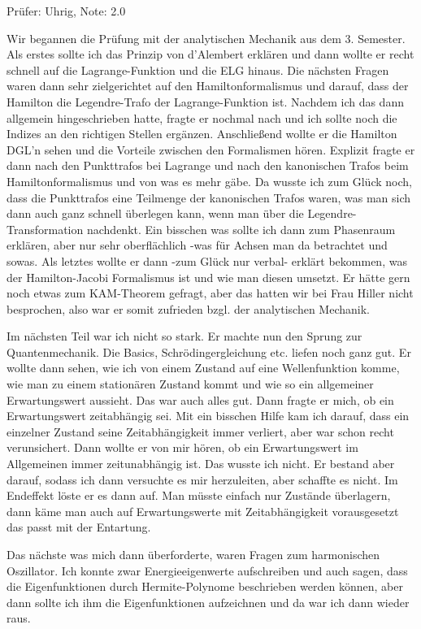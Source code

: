 Prüfer: Uhrig, Note: 2.0

\noindent Wir begannen die Prüfung mit der analytischen Mechanik aus dem 3. Semester. 
Als erstes sollte ich das Prinzip von d'Alembert erklären und dann wollte er recht schnell auf die Lagrange-Funktion und die ELG hinaus. 
Die nächsten Fragen waren dann sehr zielgerichtet auf den Hamiltonformalismus und darauf, dass der Hamilton die Legendre-Trafo der Lagrange-Funktion ist.
Nachdem ich das dann allgemein hingeschrieben hatte, fragte er nochmal nach und ich sollte noch die Indizes an den richtigen Stellen ergänzen. 
Anschließend wollte er die Hamilton DGL'n sehen und die Vorteile zwischen den Formalismen hören. Explizit fragte er dann nach den Punkttrafos bei Lagrange und nach den kanonischen Trafos beim Hamiltonformalismus und von was es mehr gäbe. Da wusste ich zum Glück noch, dass die Punkttrafos eine Teilmenge der kanonischen Trafos waren, was man sich dann auch ganz schnell überlegen kann, wenn man über die Legendre-Transformation nachdenkt. 
Ein bisschen was sollte ich dann zum Phasenraum erklären, aber nur sehr oberflächlich -was für Achsen man da betrachtet und sowas. 
Als letztes wollte er dann -zum Glück nur verbal- erklärt bekommen, was der Hamilton-Jacobi Formalismus ist und wie man diesen umsetzt. 
Er hätte gern noch etwas zum KAM-Theorem gefragt, aber das hatten wir bei Frau Hiller nicht besprochen, also war er somit zufrieden bzgl. der analytischen Mechanik.

\noindent Im nächsten Teil war ich nicht so stark. Er machte nun den Sprung zur Quantenmechanik. Die Basics, Schrödingergleichung etc. liefen noch ganz gut. Er wollte dann sehen, wie ich von einem Zustand auf eine Wellenfunktion komme, wie man zu einem stationären Zustand kommt und wie so ein allgemeiner Erwartungswert aussieht. Das war auch alles gut. 
Dann fragte er mich, ob ein Erwartungswert zeitabhängig sei. Mit ein bisschen Hilfe kam ich darauf, dass ein einzelner Zustand seine Zeitabhängigkeit immer verliert, aber war schon recht verunsichert. Dann wollte er von mir hören, ob ein Erwartungswert im Allgemeinen immer zeitunabhängig ist. Das wusste ich nicht. Er bestand aber darauf, sodass ich dann versuchte es mir herzuleiten, aber schaffte es nicht. Im Endeffekt löste er es dann auf. Man müsste einfach nur Zustände überlagern, dann käme man auch auf Erwartungswerte mit Zeitabhängigkeit vorausgesetzt das passt mit der Entartung.

\noindent Das nächste was mich dann überforderte, waren Fragen zum harmonischen Oszillator. Ich konnte zwar Energieeigenwerte aufschreiben und auch sagen, dass die Eigenfunktionen durch Hermite-Polynome beschrieben werden können, aber dann sollte ich ihm die Eigenfunktionen aufzeichnen und da war ich dann wieder raus. 

